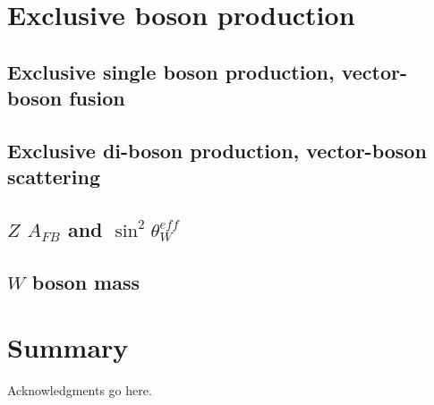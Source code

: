 \documentclass[12pt]{iopart}
\begin{document}
\section{Exclusive boson production}
\subsection{Exclusive single boson production, vector-boson fusion}


\subsection{Exclusive di-boson production, vector-boson scattering}


\subsection{$Z$ $A_{FB}$ and $\sin^2\theta^{eff}_{W}$}


\subsection{$W$ boson mass}

\section{Summary}









\ack
Acknowledgments go here.



\end{document}
